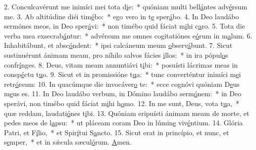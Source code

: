 2. Conculcavérunt me inimíci mei tota d\uline{i}e:~* quóniam multi bell\uline{á}ntes adv\uline{é}rsum me.
3. Ab altitúdine diéi tim\uline{é}bo:~* ego vero in t\uline{e} sper\uline{á}bo.
4. In Deo laudábo sermónes meos, in Deo sper\uline{á}vi:~* non timébo quid fáciat m\uline{i}hi c\uline{a}ro.
5. Tota die verba mea exsecrab\uline{á}ntur:~* advérsum me omnes cogitatiónes e\uline{ó}rum in m\uline{a}lum.
6. Inhabitábunt, et absc\uline{ó}ndent:~* ipsi calcáneum meum \uline{o}bserv\uline{á}bunt.
7. Sicut sustinuérunt ánimam meam, pro níhilo salvos fácies \uline{i}llos:~* in ira pópul\uline{o}s confr\uline{í}nges.
8. Deus, vitam meam annuntiávi t\uline{i}bi:~* posuísti lácrimas meas in consp\uline{é}ctu t\uline{u}o.
9. Sicut et in promissióne t\uline{u}a:~* tunc converténtur inimíci m\uline{e}i retr\uline{ó}rsum:
10. In quacúmque die invocáver\uline{o} te:~* ecce cognóvi quóniam D\uline{e}us m\uline{e}us es.
11. In Deo laudábo verbum, in Dómino laudábo serm\uline{ó}nem:~* in Deo sperávi, non timébo quid fáciat m\uline{i}hi h\uline{o}mo.
12. In me sunt, Deus, vota t\uline{u}a,~* quæ reddam, laudati\uline{ó}nes t\uline{i}bi.
13. Quóniam eripuísti ánimam meam de morte, et pedes meos de l\uline{a}psu:~* ut pláceam coram Deo in lúmin\uline{e} viv\uline{é}ntium.
14. Glória Patri, et F\uline{í}lio,~* et Spir\uline{í}tui S\uline{a}ncto.
15. Sicut erat in princípio, et nunc, et s\uline{e}mper,~* et in sǽcula sæcul\uline{ó}rum. \uline{A}men.
